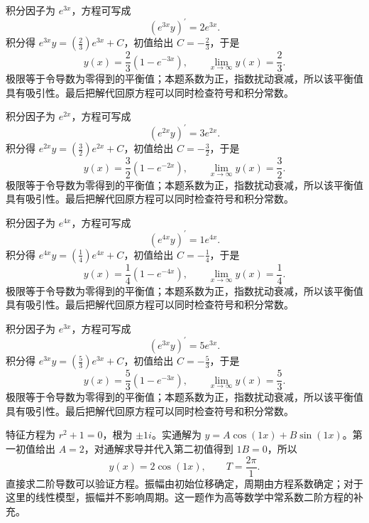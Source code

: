 \documentclass[UTF8,12pt,a4paper,fontset=fandol]{ctexart}
\begin{document}
\begin{solve}\label{ans:c22q15}
积分因子为 $e^{3x}$，方程可写成
\[
\left(e^{3x}y\right)^{\prime}=2e^{3x}.
\]
积分得 $e^{3x}y=(\frac{2}{3})e^{3x}+C$，初值给出 $C=-\frac{2}{3}$，于是
\[
y(x)=\frac{2}{3}(1-e^{-3x}),\qquad\lim_{x\to\infty}y(x)=\frac{2}{3}.
\]
极限等于令导数为零得到的平衡值；本题系数为正，指数扰动衰减，所以该平衡值具有吸引性。最后把解代回原方程可以同时检查符号和积分常数。
\end{solve}

\begin{solve}\label{ans:c22q16}
积分因子为 $e^{2x}$，方程可写成
\[
\left(e^{2x}y\right)^{\prime}=3e^{2x}.
\]
积分得 $e^{2x}y=(\frac{3}{2})e^{2x}+C$，初值给出 $C=-\frac{3}{2}$，于是
\[
y(x)=\frac{3}{2}(1-e^{-2x}),\qquad\lim_{x\to\infty}y(x)=\frac{3}{2}.
\]
极限等于令导数为零得到的平衡值；本题系数为正，指数扰动衰减，所以该平衡值具有吸引性。最后把解代回原方程可以同时检查符号和积分常数。
\end{solve}

\begin{solve}\label{ans:c22q17}
积分因子为 $e^{4x}$，方程可写成
\[
\left(e^{4x}y\right)^{\prime}=1e^{4x}.
\]
积分得 $e^{4x}y=(\frac{1}{4})e^{4x}+C$，初值给出 $C=-\frac{1}{4}$，于是
\[
y(x)=\frac{1}{4}(1-e^{-4x}),\qquad\lim_{x\to\infty}y(x)=\frac{1}{4}.
\]
极限等于令导数为零得到的平衡值；本题系数为正，指数扰动衰减，所以该平衡值具有吸引性。最后把解代回原方程可以同时检查符号和积分常数。
\end{solve}

\begin{solve}\label{ans:c22q18}
积分因子为 $e^{3x}$，方程可写成
\[
\left(e^{3x}y\right)^{\prime}=5e^{3x}.
\]
积分得 $e^{3x}y=(\frac{5}{3})e^{3x}+C$，初值给出 $C=-\frac{5}{3}$，于是
\[
y(x)=\frac{5}{3}(1-e^{-3x}),\qquad\lim_{x\to\infty}y(x)=\frac{5}{3}.
\]
极限等于令导数为零得到的平衡值；本题系数为正，指数扰动衰减，所以该平衡值具有吸引性。最后把解代回原方程可以同时检查符号和积分常数。
\end{solve}

\begin{solve}\label{ans:c22q19}
特征方程为 $r^2+1=0$，根为 $\pm 1i$。实通解为 $y=A\cos(1x)+B\sin(1x)$。第一初值给出 $A=2$，对通解求导并代入第二初值得到 $1B=0$，所以
\[
y(x)=2\cos(1x),\qquad T=\frac{2\pi}{1}.
\]
直接求二阶导数可以验证方程。振幅由初始位移确定，周期由方程系数确定；对于这里的线性模型，振幅并不影响周期。这一题作为高等数学中常系数二阶方程的补充。
\end{solve}
\end{document}
